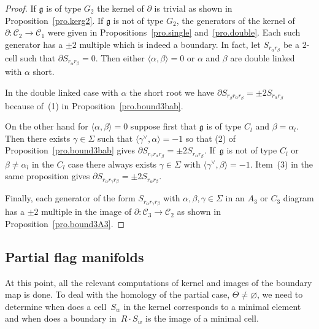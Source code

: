 \documentclass[10pt,a4paper]{amsart}
\numberwithin{equation}{section}
\begin{document}
\begin{proof}If $\mathfrak{g}$ is of type $G_{2}$ the kernel of $\partial $ is trivial as shown in Proposition~\ref{pro.kerg2}. If $\mathfrak{g}$ is not of type $G_{2} $, the generators of the kernel of $\partial\colon \mathcal{C}_{2}\longrightarrow \mathcal{C}_{1}$ were given in Propositions~\ref{pro.single} and~\ref{pro.double}. Each such generator has a $\pm 2$ multiple which is indeed a boundary. In fact, let $S_{r_{\alpha }r_{\beta }}$ be a $2$-cell such that $\partial S_{r_{\alpha }r_{\beta }}=0$. Then either $\langle \alpha,\beta \rangle =0$ or $\alpha $ and $\beta $ are double linked with $\alpha $ short.

In the double linked case with $\alpha $ the short root we have $\partial S_{r_{\beta }r_{\alpha }r_{\beta }}=\pm 2S_{r_{\alpha }r_{\beta }}$ because of~(1) in Proposition~\ref{pro.bound3bab}.

On the other hand for $ \langle \alpha,\beta \rangle =0$ suppose first that $\mathfrak{g}$ is of type $C_{l}$ and $\beta =\alpha _{l}$. Then there exists $\gamma \in \Sigma $ such that $ \langle \gamma ^{\vee},\alpha \rangle =-1$ so that (2) of Proposition~\ref{pro.bound3bab} gives $\partial S_{r_{\gamma }r_{\alpha }r_{\beta }}=\pm 2S_{r_{\alpha}r_{\beta }}$. If~$\mathfrak{g}$ is not of type $C_{l}$ or $\beta \neq \alpha _{l}$ in the $C_{l}$ case there always exists $\gamma \in \Sigma $ with $\langle \gamma ^{\vee },\beta \rangle =-1$. Item~(3) in the same proposition gives $\partial S_{r_{\alpha }r_{\gamma }r_{\beta }}=\pm 2S_{r_{\alpha }r_{\beta }}$.

Finally, each generator of the form $S_{r_{\alpha }r_{\gamma }r_{\beta }}$ with $\alpha,\beta,\gamma \in \Sigma $ in an $A_{3}$ or $C_{3}$ diagram has a $\pm 2$ multiple in the image of $\partial\colon \mathcal{C}_{3}\longrightarrow \mathcal{C}_{2}$ as shown in Proposition~\ref{pro.bound3A3}.
\end{proof}

\subsection{Partial flag manifolds}

At this point, all the relevant computations of kernel and images of the boundary map is done. To deal with the homology of the partial case, $\Theta \neq \varnothing$, we need to determine when does a cell~$S_{w}$ in the kernel corresponds to a minimal element and when does a boundary in~$R\cdot S_{w}$ is the image of a minimal cell.
\end{document}
